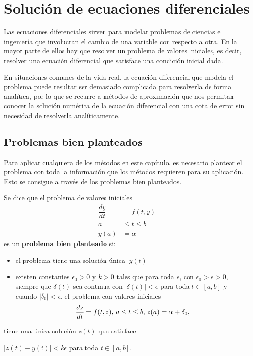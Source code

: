 \chapter{Solución de ecuaciones diferenciales}

Las ecuaciones diferenciales sirven para modelar problemas de ciencias e ingeniería que involucran el cambio de una 
variable con respecto a otra. En la mayor parte de ellos hay que resolver un problema de valores iniciales, es decir, 
resolver una ecuación diferencial que satisface una condición inicial dada.

En situaciones comunes de la vida real, la ecuación diferencial que modela el problema puede resultar ser demasiado 
complicada para resolverla de forma analítica, por lo que se recurre a métodos de aproximación que nos permitan conocer 
la solución numérica de la ecuación diferencial con una cota de error sin necesidad de resolverla analíticamente.

\section{Problemas bien planteados}
Para aplicar cualquiera de los métodos en este capítulo, es necesario plantear el problema con toda la información
que los métodos requieren para su aplicación. Esto se consigue a través de los problemas bien planteados.

\begin{definition}
	Se dice que el problema de valores iniciales
	\begin{align}
		\dfrac{dy}{dt} &= f(t,y) \nonumber\\
		a&\leq t\leq b \nonumber\\
		y(a)&=\alpha
		\label{eq:EDBienPlanteada}
	\end{align}
	es un \textbf{problema bien planteado} si:
	\begin{itemize}
		\item el problema tiene una solución única: $y(t)$
		\item existen constantes $\epsilon_0>0$ y $k>0$ tales que para toda $\epsilon$, con $\epsilon_0>\epsilon>0$, siempre que $\delta(t)$ sea continua con
			$|\delta (t)|<\epsilon$ para toda $t\in [a,b]$ y cuando $|\delta_0| < \epsilon$, el problema con valores iniciales
			\begin{equation}
				{dz\over dt} = f(t,z), \, a\leq t\leq b, \, z(a) = \alpha + \delta_0,
			\end{equation}
	\end{itemize}
	tiene una única solución $z(t)$ que satisface
	\begin{center}
		$|z(t) - y(t)| < k\epsilon$ para toda $t\in [a,b]$.
	\end{center}	 
\end{definition}


